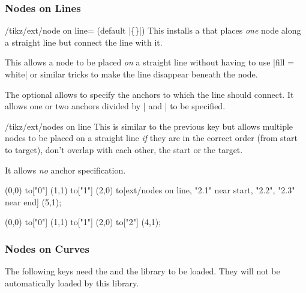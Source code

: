 \begin{multicols}{2}
\subsubsection{Nodes on Lines}

\begin{stylekey}{/tikz/ext/node on line= (default |\{\}|)}
This installs a  that places \emph{one}
node along a straight line but connect the line with it.

This allows a node to be placed \emph{on} a straight line without having to
use |fill = white| or similar tricks to make the line disappear 
beneath the node.

The optional  allows to specify the
anchors to which the line should connect.
It allows one or two anchors divided by | and | to be specified.
\end{stylekey}

\begin{stylekey}{/tikz/ext/nodes on line}
This is similar to the previous key but allows
multiple nodes to be placed on a straight line
\emph{if} they are in the correct order (from start to target),
don't overlap with each other, the start or the target.

It allows \emph{no} anchor specification.
\end{stylekey}

\begin{codeexample}[preamble=\usetikzlibrary{ext.nodes, quotes}]
\tikz[inner sep=.15em, circle, nodes=draw, sloped]
   (0,0) to["0"] (1,1)
                                                 to["1"] (2,0)
    to[ext/nodes on line, "2.1" near start, "2.2", "2.3" near end] (5,1);
\end{codeexample}
\begin{codeexample}[preamble=\usetikzlibrary{ext.nodes, quotes}]
\tikz[inner sep=.15em, nodes=draw]
  \draw[thick, ->, ext/node on line=west and east]
     (0,0) to["0"] (1,1)
           to["1"] (2,0)
           to["2"] (4,1);
\end{codeexample}

\subsubsection{Nodes on Curves}
The following keys need the 
and the  \cite{spath3}
library to be loaded. They will not be automatically
loaded by this library.


\end{multicols}
